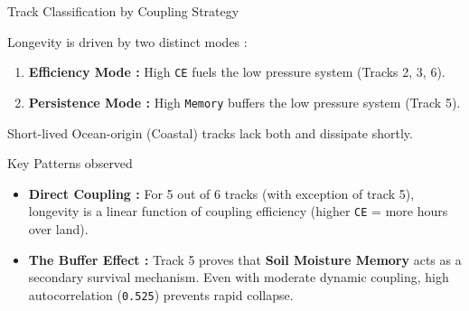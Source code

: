 \documentclass[8pt, aspectratio=169]{beamer}
\begin{document}
\begin{frame}{Track Classification by Coupling Strategy}
    \begin{block}{\footnotesize Longevity is driven by two distinct modes :}
        \begin{enumerate}
            \footnotesize
            \item \textbf{Efficiency Mode :} High \texttt{CE} fuels the low pressure system (Tracks 2, 3, 6).
            \item \textbf{Persistence Mode :} High \texttt{Memory} buffers the low pressure system (Track 5).
        \end{enumerate}
        \footnotesize
        Short-lived Ocean-origin (Coastal) tracks lack both and dissipate shortly.
    \end{block}

    \footnotesize
    \begin{block}{Key Patterns observed}
        \begin{itemize}
            \item \textbf{Direct Coupling :} For 5 out of 6 tracks (with exception of track 5), longevity is a linear function of coupling efficiency (higher \texttt{CE} = more hours over land).
            \item \textbf{The Buffer Effect :} Track 5 proves that \textbf{Soil Moisture Memory} acts as a secondary survival mechanism. Even with moderate dynamic coupling, high autocorrelation (\texttt{0.525}) prevents rapid collapse.
        \end{itemize}
    \end{block}
\end{frame}
\end{document}
